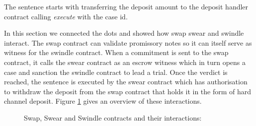The sentence starts with transferring the deposit amount to the deposit handler contract calling \emph{execute} with the case id.


In this section we connected the dots and showed how swap swear and swindle interact.
The swap contract can validate promissory notes so it can itself serve as witness for the swindle contract.
When a commitment is sent to the swap contract, it calls the swear contract as an escrow witness which in turn opens a case and sanction the swindle contract to lead a trial.
Once the verdict is reached, the sentence is executed by the swear contract which has authorisation to withdraw the deposit from the swap contract that holds it in the form of hard channel deposit. Figure \ref{fig:sw3} gives an  overview of these interactions.

\begin{center}
\begin{figure}
\begin{center}
\begin{tikzpicture}
\end{tikzpicture}
\end{center}
\caption{Swap, Swear and Swindle contracts and their interactions:
}
\label{fig:sw3}
\end{figure}
\end{center}